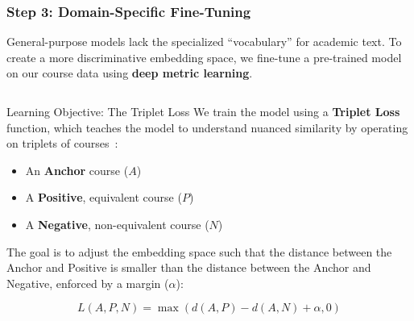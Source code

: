 \documentclass[aspectratio=169,10pt]{beamer}
\begin{document}
\begin{frame}
    \frametitle{Step 3: Domain-Specific Fine-Tuning}
    
    General-purpose models lack the specialized ``vocabulary'' for academic text. To create a more discriminative embedding space, we fine-tune a pre-trained model on our course data using \textbf{deep metric learning}.
    
    \fontsize{9}{9}\selectfont
    \begin{columns}[T]
        \begin{column}{0.55\textwidth}
            \begin{alertblock}{Learning Objective: The Triplet Loss}
                We train the model using a \textbf{Triplet Loss} function, which teaches the model to understand nuanced similarity by operating on triplets of courses~\cite{Schroff_2015_CVPR, hermans2017defensetripletlossperson}:
                \begin{itemize}
                    \item An \textbf{Anchor} course (\(A\))
                    \item A \textbf{Positive}, equivalent course (\(P\))
                    \item A \textbf{Negative}, non-equivalent course (\(N\))
                \end{itemize}
                
                \vspace{0.5em}
                The goal is to adjust the embedding space such that the distance between the Anchor and Positive is smaller than the distance between the Anchor and Negative, enforced by a margin (\(\alpha\)):
                
                \[ L(A, P, N) = \max\left(d(A, P) - d(A, N) + \alpha, 0\right) \]
            \end{alertblock}
        \end{column}
        

\end{columns}
\end{frame}
\end{document}
